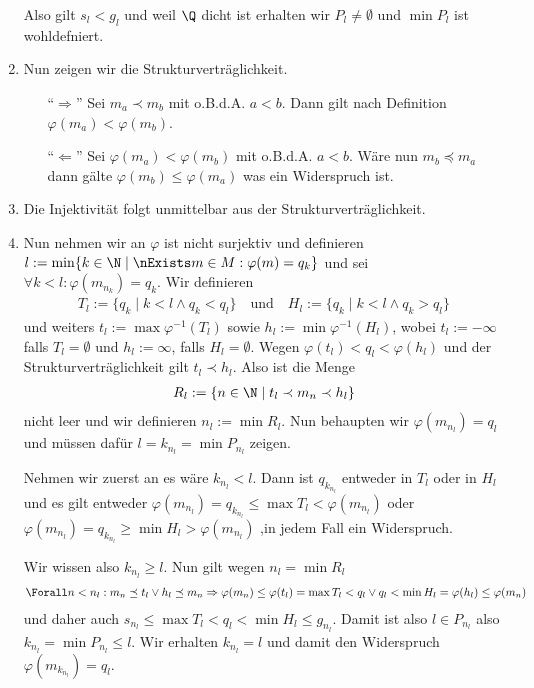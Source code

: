 \begin{solution}
\begin{enumerate}
        Also gilt $s_l < g_l$ und weil $\Q$ dicht ist erhalten wir $P_l \neq \emptyset$ und $\min P_l$ ist wohldefniert.
        \item Nun zeigen wir die Strukturverträglichkeit.
            \begin{enumerate}
                \item [``$\Rightarrow$''] Sei $m_a \prec m_b$ mit o.B.d.A. $a < b$. Dann gilt nach Definition $\varphi(m_a) < \varphi(m_b)$.
                \item [``$\Leftarrow$''] Sei $\varphi(m_a) < \varphi(m_b)$ mit o.B.d.A. $a < b$. Wäre nun $m_b \preceq m_a$ dann gälte $\varphi(m_b) \leq \varphi(m_a)$ was ein Widerspruch ist.
            \end{enumerate}
        \item Die Injektivität folgt unmittelbar aus der Strukturverträglichkeit.
        \item Nun nehmen wir an $\varphi$ ist nicht surjektiv und definieren $l := \min \{k \in \N \mid \nExists m \in M : \varphi(m) = q_k \}$ und sei $\forall k < l: \varphi(m_{n_k}) = q_k$. Wir definieren
        \begin{align*}
            T_l := \{q_k \mid k < l \land q_k < q_l\} \quad \textrm{und} \quad H_l := \{q_k \mid k < l \land q_k > q_l\}
        \end{align*}
        und weiters $t_l := \max \varphi^{-1}(T_l)$ sowie $h_l := \min \varphi^{-1}(H_l)$, wobei $t_l := -\infty$ falls $T_l = \emptyset$ und $h_l := \infty$, falls $H_l = \emptyset$. Wegen $\varphi(t_l) < q_l < \varphi(h_l)$ und der Strukturverträglichkeit gilt $t_l \prec h_l$. Also ist die Menge
        \begin{align*}
            R_l := \{n \in \N \mid t_l \prec m_n \prec h_l\}
        \end{align*}
        nicht leer und wir definieren $n_l := \min R_l$. Nun behaupten wir $\varphi(m_{n_l}) = q_l$ und müssen dafür $l = k_{n_l} = \min P_{n_l}$ zeigen.

        Nehmen wir zuerst an es wäre $k_{n_l} < l$. Dann ist $q_{k_{n_l}}$ entweder in $T_l$ oder in $H_l$ und es gilt entweder $\varphi(m_{n_l}) = q_{k_{n_l}}  \leq \max T_l < \varphi(m_{n_l})$ oder $\varphi(m_{n_l}) = q_{k_{n_l}} \geq \min H_l > \varphi(m_{n_l})$ ,in jedem Fall ein Widerspruch.

        Wir wissen also $k_{n_l} \geq l$. Nun gilt wegen $n_l = \min R_l$
        \begin{align*}
            \Forall n < n_l: m_n \preceq t_l \lor h_l \preceq m_n \Rightarrow \varphi(m_n) \leq \varphi(t_l) = \max T_l < q_l  \lor q_l < \min H_l = \varphi(h_l) \leq \varphi(m_n)
        \end{align*}
        und daher auch $s_{n_l} \leq \max T_l < q_l < \min H_l \leq g_{n_l}$. Damit ist also $l \in P_{n_l}$ also $k_{n_l} = \min P_{n_l} \leq l$. Wir erhalten $k_{n_l} = l$ und damit den Widerspruch $\varphi(m_{k_{n_l}}) = q_l$.
    \end{enumerate}
\end{solution}
